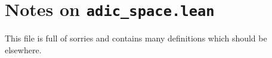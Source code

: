 \documentclass{amsart}
\theoremstyle{plain}
\theoremstyle{remark}
\begin{document}
\section{Notes on {\tt adic\_space.lean}}

This file is full of sorries and contains many definitions which should be elsewhere.
\end{document}
